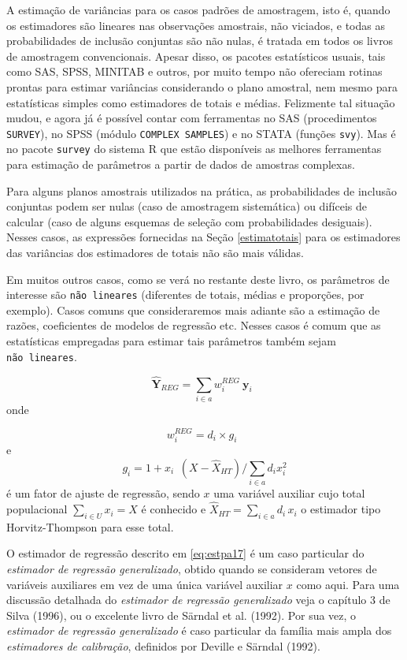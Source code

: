 \documentclass[
  12pt,
  brazilian,
]{book}
\theoremstyle{definition}
\theoremstyle{definition}
\theoremstyle{definition}
\theoremstyle{definition}
\theoremstyle{remark}
\begin{document}
A estimação de variâncias para os casos padrões de amostragem, isto é, quando os estimadores são lineares nas observações amostrais, não viciados, e todas as probabilidades de inclusão conjuntas são não nulas, é tratada em todos os
livros de amostragem convencionais. Apesar disso, os pacotes estatísticos usuais, tais como SAS, SPSS, MINITAB e outros, por muito tempo não ofereciam rotinas prontas para estimar variâncias considerando o plano amostral, nem mesmo para estatísticas simples como estimadores de totais e médias. Felizmente tal situação mudou, e agora já é possível contar com ferramentas no SAS (procedimentos \texttt{SURVEY}), no SPSS (módulo \texttt{COMPLEX\ SAMPLES}) e no STATA (funções \texttt{svy}). Mas é no pacote \texttt{survey} do sistema R que estão disponíveis as melhores ferramentas para estimação de parâmetros a partir de dados de amostras complexas.

Para alguns planos amostrais utilizados na prática, as probabilidades de inclusão conjuntas podem ser nulas (caso de amostragem sistemática) ou difíceis de calcular (caso de alguns esquemas de seleção com probabilidades desiguais). Nesses casos, as expressões fornecidas na Seção \ref{estimatotais} para os estimadores das variâncias dos estimadores de totais não são mais válidas.

Em muitos outros casos, como se verá no restante deste livro, os parâmetros de interesse são \texttt{não\ lineares} (diferentes de totais, médias e proporções, por exemplo). Casos comuns que consideraremos mais adiante são a estimação de razões,
coeficientes de modelos de regressão etc. Nesses casos é comum que as estatísticas empregadas para estimar tais parâmetros também sejam \texttt{não\ lineares}.

\[
\mathbf{\widehat{Y}}_{REG} = \sum_{i \in a} {w_i^{REG} \ } \mathbf{y}_i \,\,\,  \label{eq:estpa17}
\]
onde

\[
w_i^{REG} = d_i \times g_i \,\,\, \label{eq:estpa18}
\]
e
\[
g_{i} = 1 + x_{i \mbox{ }} (X - \widehat{X}_{HT}) / \sum_{i \in a} d_i x_i^2
\]
é um fator de ajuste de regressão, sendo \(x\) uma variável auxiliar cujo total populacional \(\sum_{i \in U} x_i = X\) é conhecido e \(\widehat{X}_{HT} = \sum_{i \in a} d_i \, x_i\) o estimador tipo Horvitz-Thompson para esse total.

O estimador de regressão descrito em \eqref{eq:estpa17} é um caso particular do \emph{estimador de regressão generalizado}, obtido quando se consideram vetores de variáveis auxiliares em vez de uma única variável auxiliar \(x\) como aqui. Para uma discussão detalhada do \emph{estimador de regressão generalizado} veja o capítulo 3 de Silva (1996), ou o excelente livro de Särndal et al. (1992). Por sua vez, o \emph{estimador de regressão generalizado} é caso particular da família mais ampla dos \emph{estimadores de calibração}, definidos por Deville e Särndal (1992).
\end{document}
